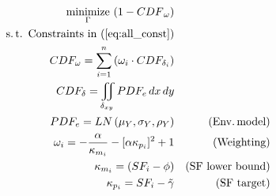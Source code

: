 \documentclass[letterpaper, 10 pt, conference]{ieeeconf}  %
\begin{document}
\begin{figure}
\begin{subequations}
\label{eq:objective_all}
\begin{align}
\underset{\Gamma}{\operatorname{minimize}}\  \color{black} (1-{CDF}_{\omega})\label{eq:objective}\\
 \color{black}\operatorname{s.t.\ Constraints\ in\ (\ref{eq:all_const})}\nonumber\\
CDF_{\omega} =  \sum_{i=1}^{n}\left(\omega_{i} \cdot CDF_{\delta_i}\right)\label{eq:CDF_weighted}
\\
CDF_{\delta} = \iint_{\delta_{xy}} PDF_e \,dx\,dy \label{eq:cdf_sampled}\\
PDF_e = LN\left(\mu_Y, \sigma_Y, \rho_Y\right)  && %
\operatorname{(Env. model)}\label{eq:bvln}\\
\omega_i=-\frac{\alpha}{\kappa_{m_i}}-[\alpha\kappa_{p_i}]^{2}+1\label{eq:weighting_function} && %
\color{black}\operatorname{(Weighting)}\\
\kappa_{m_i} = (SF_i - \phi) &&\color{black}\operatorname{(SF\ lower\ bound)} \label{eq:sf_phi}\\
\kappa_{p_i} = SF_i - \tilde{\gamma} && \color{black}\operatorname{(SF\ target)}\label{eq:sf_gamma}\\

\end{align}
\end{subequations}
\end{figure}
\end{document}
